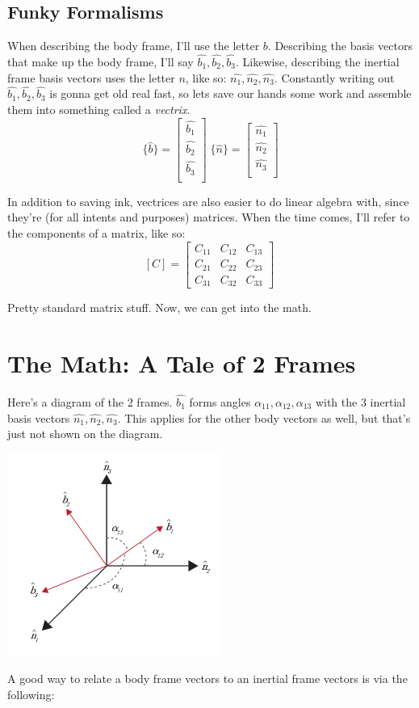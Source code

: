 \documentclass[a4paper,14pt]{extreport}
\newcommand{\bv}[1]{\hat{b_{#1}}}
\newcommand{\nv}[1]{\hat{n_{#1}}}
\begin{document}
\subsection{Funky Formalisms}
When describing the body frame, I'll use the letter $b$. Describing the basis vectors that make up the body frame, I'll say $\bv{1}, \bv{2}, \bv{3}$. Likewise, describing the inertial frame basis vectors uses the letter $n$, like so: $\nv{1}, \nv{2}, \nv{3}$. Constantly writing out $\bv{1}, \bv{2}, \bv{3}$ is gonna get old real fast, so lets save our hands some work and assemble them into something called a \emph{vectrix}.
\[
\{\hat{b}\} = 
\begin{bmatrix}
\bv{1}\\ \bv{2}\\ \bv{3}\\
\end{bmatrix}\;
\{\hat{n}\} = 
\begin{bmatrix}
\nv{1}\\ \nv{2}\\ \nv{3}\\
\end{bmatrix}
\] 

In addition to saving ink, vectrices are also easier to do linear algebra with, since they're (for all intents and purposes) matrices. When the time comes, I'll refer to the components of a matrix, like so:
\[
[C] = \begin{bmatrix}
C_{11}&C_{12}&C_{13}\\
C_{21}&C_{22}&C_{23}\\
C_{31}&C_{32}&C_{33}
\end{bmatrix}\
\]

Pretty standard matrix stuff. Now, we can get into the math.
\section{The Math: A Tale of 2 Frames}
Here's a diagram of the 2 frames. $\bv{1}$ forms angles $\alpha_{11}, \alpha_{12}, \alpha_{13}$ with the 3 inertial basis vectors $\nv{1},\nv{2},\nv{3}$. This applies for the other body vectors as well, but that's just not shown on the diagram.
\begin{center}
\includegraphics[width=7cm]{dcmalpha}
\end{center}
A good way to relate a body frame vectors to an inertial frame vectors is via the following:
\end{document}
